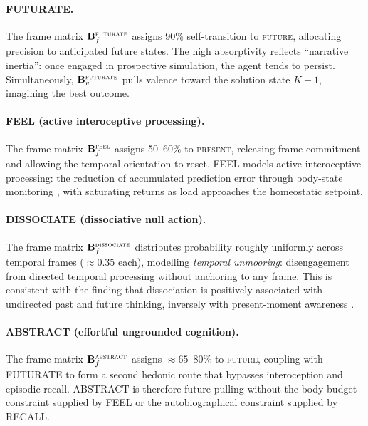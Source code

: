 \documentclass[11pt,a4paper]{article}
\begin{document}
\paragraph{FUTURATE.} The frame matrix $\mathbf{B}_f^{\textsc{futurate}}$ assigns 90\% self-transition to \textsc{future}, allocating precision to anticipated future states. The high absorptivity reflects ``narrative inertia'': once engaged in prospective simulation, the agent tends to persist. Simultaneously, $\mathbf{B}_v^{\textsc{futurate}}$ pulls valence toward the solution state $K{-}1$, imagining the best outcome.

\paragraph{FEEL (active interoceptive processing).} The frame matrix $\mathbf{B}_f^{\textsc{feel}}$ assigns 50--60\% to \textsc{present}, releasing frame commitment and allowing the temporal orientation to reset. FEEL models active interoceptive processing: the reduction of accumulated prediction error through body-state monitoring \citep{stephan2016allostatic}, with saturating returns as load approaches the homeostatic setpoint.

\paragraph{DISSOCIATE (dissociative null action).} The frame matrix $\mathbf{B}_f^{\textsc{dissociate}}$ distributes probability roughly uniformly across temporal frames ($\approx 0.35$ each), modelling \emph{temporal unmooring}: disengagement from directed temporal processing without anchoring to any frame. This is consistent with the finding that dissociation is positively associated with undirected past and future thinking, inversely with present-moment awareness \citep{vannikov2018dissociation}.

\paragraph{ABSTRACT (effortful ungrounded cognition).} The frame matrix $\mathbf{B}_f^{\textsc{abstract}}$ assigns $\approx 65$--$80\%$ to \textsc{future}, coupling with FUTURATE to form a second hedonic route that bypasses interoception and episodic recall. ABSTRACT is therefore future-pulling without the body-budget constraint supplied by FEEL or the autobiographical constraint supplied by RECALL.
\end{document}
